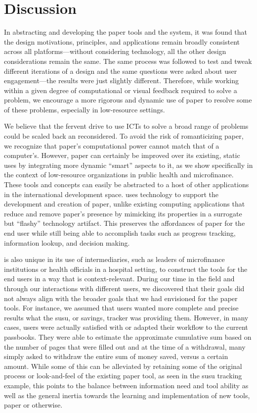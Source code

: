 \documentclass{sig-alternate}
\begin{document}

\section{Discussion}
\label{sec:discussion}

In abstracting and developing the paper tools and the \nifty system, it was found that the design motivations, principles, and applications remain broadly consistent across all platforms---without considering technology, all the other design considerations remain the same. The same process was followed to test and tweak different iterations of a design and the same questions were asked about user engagement---the results were just slightly different. Therefore, while working within a given degree of computational or visual feedback required to solve a problem, we encourage a more rigorous and dynamic use of paper to resolve some of these problems, especially in low-resource settings.

We believe that the fervent drive to use ICTs to solve a broad range of problems could be scaled back an reconsidered. To avoid the risk of romanticizing paper, we recognize that paper's computational power cannot match that of a computer's. However, paper can certainly be improved over its existing, static uses by integrating more dynamic ``smart'' aspects to it, as we show specifically in the context of low-resource organizations in public health and microfinance. These tools and concepts can easily be abstracted to a host of other applications in the international development space. \nifty uses technology to support the development and creation of paper, unlike existing computing applications that reduce and remove paper's presence by mimicking its properties in a surrogate but ``flashy'' technology artifact. This preserves the affordances of paper for the end user while still being able to accomplish tasks such as progress tracking, information lookup, and decision making. 

\nifty is also unique in its use of intermediaries, such as leaders of microfinance institutions or health officials in a hospital setting, to construct the tools for the end users in a way that is context-relevant. During our time in the field and through our interactions with different users, we discovered that their goals did not always align with the broader goals that we had envisioned for the paper tools. For instance, we assumed that users wanted more complete and precise results what the susu, or savings, tracker was providing them. However, in many cases, users were actually satisfied with or adapted their workflow to the current passbooks. They were able to estimate the approximate cumulative sum based on the number of pages that were filled out and at the time of a withdrawal, many simply asked to withdraw the entire sum of money saved, versus a certain amount. While some of this can be alleviated by retaining some of the original process or look-and-feel of the existing paper tool, as seen in the susu tracking example, this points to the balance between information need and tool ability as well as the general inertia towards the learning and implementation of new tools, paper or otherwise.
\end{document}
